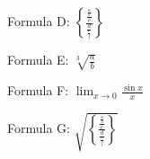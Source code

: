 \documentclass{article}
\begin{document}
\noindent Formula D: $\displaystyle\left\{\frac{\frac{\frac{a}{b}}{c}}{\frac{d}{\frac{e}{f}}}\right\}$

\vspace{2em}
\noindent Formula E: $\displaystyle\sqrt[3]{\frac{a}{b}}$

\vspace{2em}
\noindent Formula F: $\displaystyle\lim_{x\to 0}\frac{\sin x}{x}$

\vspace{2em}
\noindent Formula G: $\displaystyle\sqrt{\left\{\frac{\frac{\frac{a}{b}}{c}}{\frac{d}{\frac{e}{f}}}\right\}}$
\end{document}
